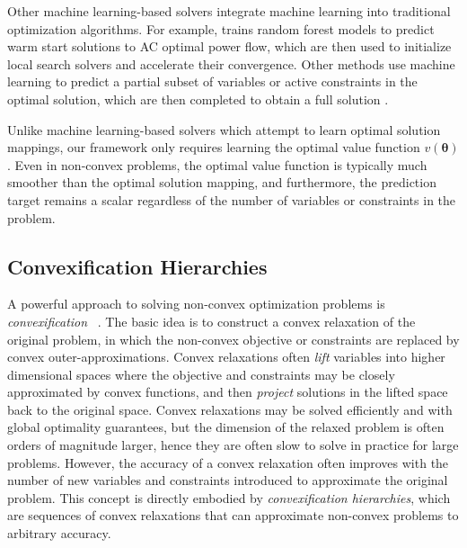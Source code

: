 \documentclass[10pt]{article} %
\theoremstyle{plain}
\theoremstyle{definition}
\theoremstyle{remark}
\begin{document}
Other machine learning-based solvers integrate machine learning into traditional optimization algorithms. For example, \citet{baker2019learning} trains random forest models to predict warm start solutions to AC optimal power flow, which are then used to initialize local search solvers and accelerate their convergence. Other methods use machine learning to predict a partial subset of variables or active constraints in the optimal solution, which are then completed to obtain a full solution \citep{donti2021dc3, deka2019learning}.

Unlike machine learning-based solvers which attempt to learn optimal solution mappings, our framework only requires learning the optimal value function $v(\bm{\theta})$. Even in non-convex problems, the optimal value function is typically much smoother than the optimal solution mapping, and furthermore, the prediction target remains a scalar regardless of the number of variables or constraints in the problem.

\subsection*{Convexification Hierarchies}


A powerful approach to solving non-convex optimization problems is \textit{convexification} ~\citep{zhang2018conic}. The basic idea is to construct a convex relaxation of the original problem, in which the non-convex objective or constraints are replaced by convex outer-approximations.
Convex relaxations often \textit{lift} variables into higher dimensional spaces where the objective and constraints may be closely approximated by convex functions, and then \textit{project} solutions in the lifted space back to the original space.
Convex relaxations may be solved efficiently and with global optimality guarantees, but the dimension of the relaxed problem is often orders of magnitude larger, hence they are often slow to solve in practice for large problems.
However, the accuracy of a convex relaxation often improves with the number of new variables and constraints introduced to approximate the original problem.
This concept is directly embodied by \textit{convexification hierarchies}, which are sequences of convex relaxations that can approximate non-convex problems to arbitrary accuracy.
\end{document}
